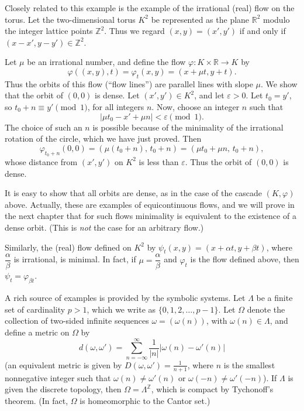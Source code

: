 Closely related to this example is the example of the irrational (real) flow on the torus. Let the two-dimensional torus $K^2$ be represented as the plane $\mathbb{R}^2$ modulo the integer lattice points $\mathbb{Z}^2$. Thus we regard $(x,y) = (x',y')$ if and only if $(x - x', y - y') \in \mathbb{Z}^2$.

Let $\mu$ be an irrational number, and define the flow $\varphi : K \times \mathbb{R} \to K$ by
\[
    \varphi((x,y),t) = \varphi_t(x,y) = (x + \mu t, y + t).
\]
Thus the orbits of this flow (“flow lines”) are parallel lines with slope $\mu$. We show that the orbit of $(0,0)$ is dense. Let $(x',y') \in K^2$, and let $\varepsilon > 0$. Let $t_0 = y'$, so $t_0 + n \equiv y' \pmod{1}$, for all integers $n$. Now, choose an integer $n$ such that
\[
    |\mu t_0 - x' + \mu n| < \varepsilon \pmod{1}.
\]
The choice of such an $n$ is possible because of the minimality of the irrational rotation of the circle, which we have just proved. Then
\[
    \varphi_{t_0 + n}(0,0) = (\mu (t_0 + n),\, t_0 + n) = (\mu t_0 + \mu n,\, t_0 + n),
\]
whose distance from $(x',y')$ on $K^2$ is less than $\varepsilon$. Thus the orbit of $(0,0)$ is dense.


It is easy to show that all orbits are dense, as in the case of the cascade $(K, \varphi)$ above. Actually, these are examples of equicontinuous flows, and we will prove in the next chapter that for such flows minimality is equivalent to the existence of a dense orbit. (This is \emph{not} the case for an arbitrary flow.)


Similarly, the (real) flow defined on $K^2$ by $\psi_t(x,y) = (x + \alpha t, y + \beta t)$, where $\dfrac{\alpha}{\beta}$ is irrational, is minimal. In fact, if $\mu = \dfrac{\alpha}{\beta}$ and $\varphi_t$ is the flow defined above, then $\psi_t = \varphi_{\beta t}$.




A rich source of examples is provided by the symbolic systems. Let $\Lambda$ be a finite set of cardinality $p > 1$, which we write as $\{0,1,2,\ldots,p-1\}$. Let $\Omega$ denote the collection of two-sided infinite sequences $\omega = (\omega(n))$, with $\omega(n) \in \Lambda$, and define a metric on $\Omega$ by
\[
    d(\omega, \omega') = \sum_{n=-\infty}^{\infty} \frac{1}{|n|} |\omega(n) - \omega'(n)|
\]
(an equivalent metric is given by $D(\omega, \omega') = \frac{1}{n+1}$, where $n$ is the smallest nonnegative integer such that $\omega(n) \neq \omega'(n)$ or $\omega(-n) \neq \omega'(-n)$). If $\Lambda$ is given the discrete topology, then $\Omega = \Lambda^{\mathbb{Z}}$, which is compact by Tychonoff’s theorem. (In fact, $\Omega$ is homeomorphic to the Cantor set.)

